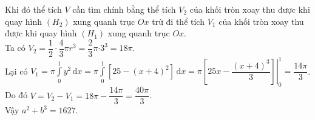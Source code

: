 \begin{ex}
{{
}
\noindent Khi đó thể tích $V$ cần tìm chính bằng thể tích $V_2$ của khối tròn xoay thu được khi quay hình $\left(H_2\right)$ xung quanh trục $Ox$ trừ đi thể tích $V_1$ của khối tròn xoay thu được khi quay hình $\left(H_1\right)$ xung quanh trục $Ox$.\\
Ta có $V_2=\dfrac{1}{2}\cdot \dfrac{4}{3}\pi r^3=\dfrac{2}{3}\pi {\cdot 3^3}=18\pi$.\\
Lại có $V_1=\pi\displaystyle\int\limits_0^1y^2\mathrm{\,d}x=\pi\displaystyle\int\limits_0^1\left[25-\left(x+4\right)^2\right]\mathrm{\,d}x=\left.\pi \left[25x-\dfrac{\left(x+4\right)^3}{3}\right]\right|_0^1
=\dfrac{14\pi}{3}$.\\
Do đó $V=V_2-V_1=18\pi-\dfrac{14\pi}{3}=\dfrac{40\pi}{3}$.\\
Vậy $a^2+b^3=1627$.
}
\end{ex}
